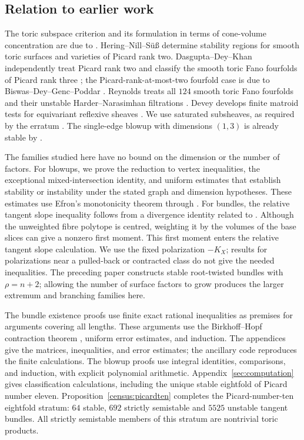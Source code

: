 

\subsection*{Relation to earlier work}
The toric subspace criterion and its formulation in terms of
cone-volume concentration are due to
\cite{Klyachko1990,HeringNillSuess2022}. Hering--Nill--S\"u\ss{}
determine stability regions for smooth toric surfaces and varieties
of Picard rank two. Dasgupta--Dey--Khan independently treat Picard
rank two and classify the smooth toric Fano fourfolds of Picard rank
three \cite{DasguptaDeyKhan2020}; the Picard-rank-at-most-two
fourfold case is due to Biswas--Dey--Genc--Poddar
\cite{BiswasDeyGencPoddar2021}. Reynolds treats all $124$ smooth toric
Fano fourfolds and their unstable Harder--Narasimhan filtrations
\cite{Reynolds2023}. Devey develops finite matroid tests for
equivariant reflexive sheaves \cite{Devey2022}. We use saturated
subsheaves, as required by the erratum \cite{DasguptaDeyKhan2021}.
The single-edge blowup with dimensions $(1,3)$ is already stable by
\cite[Proposition~5.6.1(2)]{DasguptaDeyKhan2020}.

The families studied here have no bound on the dimension or the number
of factors. For blowups, we prove the reduction to vertex inequalities,
the exceptional mixed-intersection identity, and uniform estimates
that establish stability or instability under the stated graph and
dimension hypotheses. These estimates use
Efron's monotonicity theorem through
\cite[Theorems~3.2--3.3]{saumardwellner2018}.
For bundles, the relative tangent slope inequality follows from a divergence
identity related to \cite[Lemma~2.2 and Eq.~(4.4)]{HenkLinke2014}.
Although the unweighted fibre polytope is centred, weighting it by the
volumes of the base slices can give a nonzero first moment. This first
moment enters the relative tangent slope calculation. We use the fixed polarization $-K_X$;
results for polarizations near a pulled-back or contracted class
\cite{NapameTipler2024,ClarkeNapameTipler2025} do not give the needed
inequalities. The preceding paper \cite{Wuebben2026} constructs stable
root-twisted bundles with $\rho=n+2$; allowing the number of surface
factors to grow produces the larger extremum and branching families here.

The bundle existence proofs use finite exact rational inequalities as
premises for arguments covering all lengths. These arguments use the
Birkhoff--Hopf contraction theorem
\cite{EvesonNussbaum1995}, uniform error estimates, and induction.
The appendices give the matrices, inequalities, and error estimates;
the ancillary code reproduces the finite calculations. The blowup
proofs use integral identities, comparisons, and induction, with
explicit polynomial arithmetic. Appendix~\ref{sec:computation} gives
classification calculations, including the unique stable eightfold
of Picard number eleven. Proposition~\ref{census:picardten} completes
the Picard-number-ten eightfold stratum: $64$ stable, $692$ strictly
semistable and $5525$ unstable tangent bundles. All strictly semistable
members of this stratum are nontrivial toric products.

